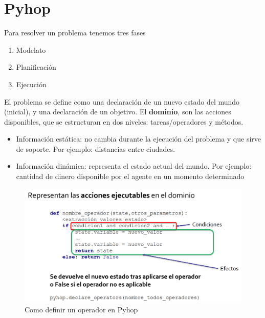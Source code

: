 \chapter{Pyhop}

Para resolver un problema tenemos tres fases
\begin{enumerate}
   \item Modelato
   \item Planificación
   \item Ejecución
\end{enumerate}

El problema se define como una declaración de un nuevo estado del mundo (inicial), y una declaración de un objetivo.
El \textbf{dominio}, son las acciones disponibles, que se estructuran en dos niveles: tareas/operadores y métodos.


\begin{itemize}
	\item Información estática: no cambia durante la ejecución del
problema y que sirve de soporte. Por ejemplo: distancias
entre ciudades.
	\item Información dinámica: representa el estado actual del
mundo. Por ejemplo: cantidad de dinero disponible por el
agente en un momento determinado
\end{itemize}

\begin{figure}[htbp]
   \centering
   \includegraphics{images/03/operador.png}
   \caption{Como definir un operador en Pyhop}
   \label{fig:03/operador}
\end{figure}

